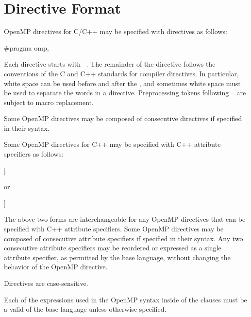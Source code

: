 \section{Directive Format}
\label{sec:Directive Format}

\begin{ccppspecific}
OpenMP directives for C/C++ may be specified with  directives as follows:
\begin{ompcPragma}
#pragma omp\plc{ directive-name [clause[ [},\plc{] clause] ... ] new-line}
\end{ompcPragma}

Each  directive  starts with ~. The remainder of
the directive follows the conventions of the C and C++ standards for compiler 
directives. In particular, white space can be used before and after the \pcode{\#}, 
and sometimes white space must be used to separate the words in a directive. 
Preprocessing tokens following ~
are subject to macro replacement.

Some OpenMP directives may be composed of consecutive 
directives if specified in their syntax.
\end{ccppspecific}

\begin{cppspecific}
Some OpenMP directives for C++ may be specified with C++ attribute specifiers as follows:
\begin{ompcPragma}
[[ omp :: \plc{directive-name}\plc{[}( \plc{[clause[}, \plc{clause]... ] } )\plc{]} ]]
\end{ompcPragma}
or
\begin{ompcPragma}
[[ using omp : \plc{directive-name}\plc{[}( \plc{[clause[}, \plc{clause]... ]} )\plc{]} ]]
\end{ompcPragma}

The above two forms are interchangeable for any OpenMP directives that can be
specified with C++ attribute specifiers.
Some OpenMP directives may be composed of consecutive attribute specifiers if 
specified in their syntax. Any two consecutive attribute specifiers may be 
reordered or expressed as a single attribute specifier, as permitted by the 
base language, without changing the behavior of the OpenMP directive. 
\end{cppspecific}

\begin{ccppspecific}
Directives are case-sensitive.

Each of the expressions used in the OpenMP syntax inside of the clauses
must be a valid  of the base language unless
otherwise specified.
\end{ccppspecific}

